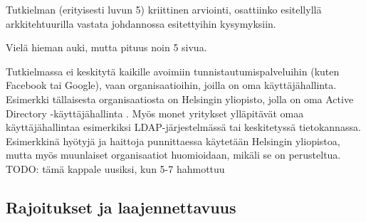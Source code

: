 Tutkielman (erityisesti luvun 5) kriittinen arviointi, osattiinko esitellyllä arkkitehtuurilla vastata johdannossa esitettyihin kysymyksiin.

Vielä hieman auki, mutta pituus noin 5 sivua.

Tutkielmassa ei keskitytä kaikille avoimiin tunnistautumispalveluihin (kuten Facebook tai Google), vaan organisaatioihin, joilla on oma käyttäjähallinta. Esimerkki tällaisesta organisaatiosta on Helsingin yliopisto, jolla on oma Active Directory -käyttäjähallinta \cite{tietotekniikkaa}. Myös monet yritykset ylläpitävät omaa käyttäjähallintaa esimerkiksi LDAP-järjestelmässä tai keskitetyssä tietokannassa. Esimerkkinä hyötyjä ja haittoja punnittaessa käytetään Helsingin yliopistoa, mutta myös muunlaiset organisaatiot huomioidaan, mikäli se on perusteltua. TODO: tämä kappale uusiksi, kun 5-7 hahmottuu

\subsection{Rajoitukset ja laajennettavuus}

